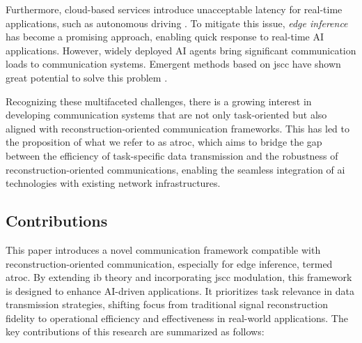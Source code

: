 Furthermore, cloud-based services introduce unacceptable latency for real-time applications, such as autonomous driving \cite{Zhang_2020_MEI, Liu_2019_ECf}. To mitigate this issue, \textit{edge inference} \cite{Li_2018_EIO, Shao_2022_LTO, Jankowski_2021_WIR} has become a promising approach, enabling quick response to real-time AI applications. However, widely deployed AI agents bring significant communication loads to communication systems. Emergent methods based on \gls{jscc} have shown great potential to solve this problem \cite{Jankowski_2021_WIR, Shao_2020_BAE, Jankowski_2020_JDE}.

Recognizing these multifaceted challenges, there is a growing interest in developing communication systems that are not only task-oriented but also aligned with reconstruction-oriented communication frameworks. This has led to the proposition of what we refer to as \gls{atroc}, which aims to bridge the gap between the efficiency of task-specific data transmission and the robustness of reconstruction-oriented communications, enabling the seamless integration of \gls{ai} technologies with existing network infrastructures.



\subsection{Contributions}
This paper introduces a novel communication framework compatible with reconstruction-oriented communication, especially for edge inference, termed \gls{atroc}. By extending \gls{ib} theory \cite{Tishby_1999_TIB} and incorporating \gls{jscc} modulation, this framework is designed to enhance AI-driven applications. It prioritizes task relevance in data transmission strategies, shifting focus from traditional signal reconstruction fidelity to operational efficiency and effectiveness in real-world applications. The key contributions of this research are summarized as follows:




